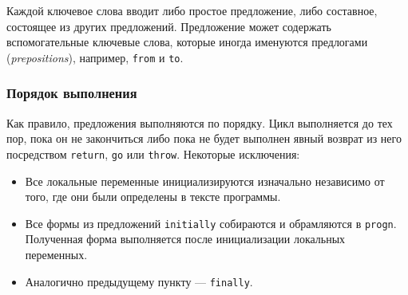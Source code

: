 Каждой ключевое слова вводит либо простое предложение, либо составное, состоящее из других предложений. Предложение может содержать вспомогательные ключевые слова, которые иногда именуются предлогами (\emph{prepositions}), например, \lstinline{from} и \lstinline{to}.

\subsubsection{Порядок выполнения}
Как правило, предложения выполняются по порядку. Цикл выполняется до тех пор, пока он не закончиться либо пока не будет выполнен явный возврат из него посредством \lstinline{return}, \lstinline{go} или \lstinline{throw}. Некоторые исключения:
\begin{itemize}
  \item Все локальные переменные инициализируются изначально независимо от того, где они были определены в тексте программы.
  \item Все формы из предложений \lstinline{initially} собираются и обрамляются в \lstinline{progn}. Полученная форма выполняется после инициализации локальных переменных.
  \item Аналогично предыдущему пункту — \lstinline{finally}.
\end{itemize}

